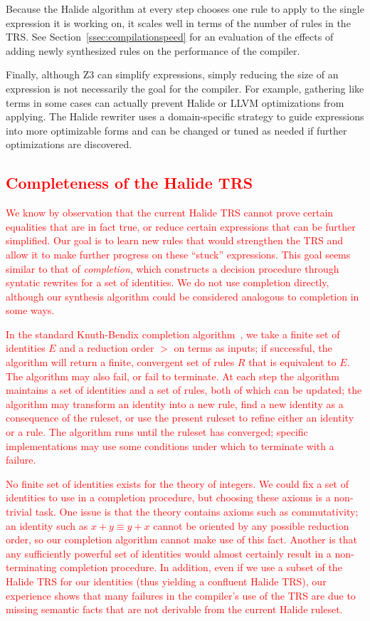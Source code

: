 \documentclass[acmsmall,review]{acmart}\settopmatter{printfolios=true,printccs=false,printacmref=false}
\newcommand{\modified}[1]{\textcolor{red}{{#1}}}
\begin{document}
Because the Halide algorithm at every step chooses one rule to apply to the single expression it is working on, it scales well in terms of the number of rules in the TRS. See Section~\ref{ssec:compilationspeed} for an evaluation of the effects of adding newly synthesized rules on the performance of the compiler. 

Finally, although Z3 can simplify expressions, simply reducing the size of an expression is not necessarily the goal for the compiler. For example, gathering like terms in some cases can actually prevent Halide or LLVM optimizations from applying. The Halide rewriter uses a domain-specific strategy to guide expressions into more optimizable forms and can be changed or tuned as needed if further optimizations are discovered. 

\subsection{\modified{Completeness of the Halide TRS}}
\label{sec:completion}

\modified{We know by observation that the current Halide TRS cannot prove certain equalities 
that are in fact true, or reduce certain expressions that can be further simplified. 
Our goal is to learn new rules that would strengthen the TRS and allow it to make
further progress on these ``stuck'' expressions. This goal seems similar to that of 
\emph{completion}, which constructs a decision procedure through syntatic rewrites
for a set of identities. We do not use completion directly, although
our synthesis algorithm could be considered analogous to completion in some ways.}

\modified{In the standard Knuth-Bendix completion algorithm~\cite{knuth1983simple}, we take a
finite set of identities $E$ and a reduction order $>$ on terms as inputs; if successful, the
algorithm will return a finite, convergent set of rules $R$ that is equivalent to 
$E$. The algorithm may also fail, or fail to terminate. At each step the algorithm
maintains a set of identities and a set of rules, both of which can be updated; the 
algorithm may transform an identity into a new rule, find a new identity as a 
consequence of the ruleset, or use the present ruleset to refine either an identity 
or a rule. The algorithm runs until the ruleset has converged; specific implementations
may use some conditions under which to terminate with a failure.}

\modified{No finite set of identities exists for the theory of integers. We could
fix a set of identities to use in a completion procedure, but choosing these axioms
is a non-trivial task. One issue is that the theory contains axioms such as commutativity;
an identity such as $x + y \equiv y + x$ cannot be oriented by any possible reduction 
order, so our completion algorithm cannot make use of this fact. Another is that any
sufficiently powerful set of identities would almost certainly result in a non-terminating
completion procedure.  In addition, even if we use a subset of the Halide TRS for our
identities (thus yielding a confluent Halide TRS), our experience shows that many
failures in the compiler's use of the TRS are due to missing semantic facts that are not
derivable from the current Halide ruleset.}
\end{document}
